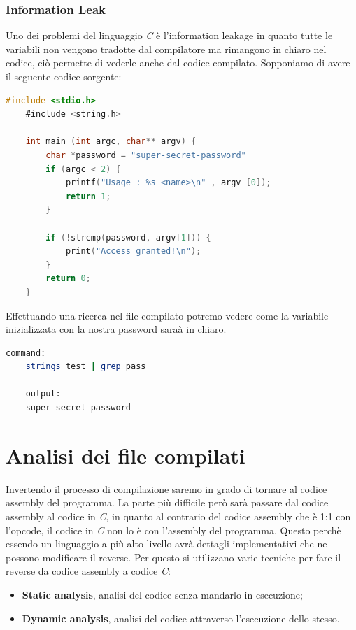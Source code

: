 \subsubsection{Information Leak}
Uno dei problemi del linguaggio \textit{C} è l'information leakage in quanto tutte le variabili non vengono tradotte dal compilatore ma rimangono in chiaro nel codice, ciò permette di vederle anche dal codice compilato. Sopponiamo di avere il seguente codice sorgente:
\begin{lstlisting}[language=C]
    #include <stdio.h>
    #include <string.h>

    int main (int argc, char** argv) {
        char *password = "super-secret-password"
        if (argc < 2) {
            printf("Usage : %s <name>\n" , argv [0]);
            return 1;
        }

        if (!strcmp(password, argv[1])) {
            print("Access granted!\n");
        }
        return 0;
    }
\end{lstlisting}
Effettuando una ricerca nel file compilato potremo vedere come la variabile inizializzata con la nostra password saraà in chiaro.
\begin{lstlisting}[language=bash]
    command:
    strings test | grep pass

    output:
    super-secret-password
\end{lstlisting}

\section{Analisi dei file compilati}

Invertendo il processo di compilazione saremo in grado di tornare al codice assembly del programma. La parte più difficile però sarà passare dal codice assembly al codice in \textit{C}, in quanto al contrario del codice assembly che è 1:1 con l'opcode, il codice in \textit{C} non lo è con l'assembly del programma.
Questo perchè essendo un linguaggio a più alto livello avrà dettagli implementativi che ne possono modificare il reverse.
Per questo si utilizzano varie tecniche per fare il reverse da codice assembly a codice \textit{C}:
\begin{itemize}
    \item \textbf{Static analysis}, analisi del codice senza mandarlo in esecuzione;
    \item \textbf{Dynamic analysis}, analisi del codice attraverso l'esecuzione dello stesso.
\end{itemize}

